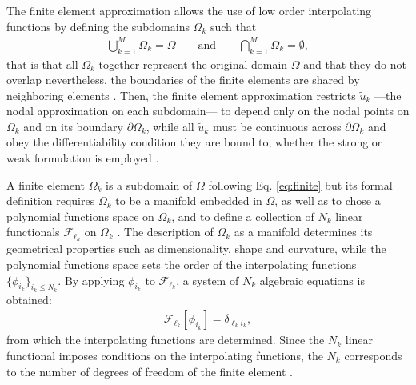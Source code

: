 
%
%
%
The finite element approximation allows the use of low order interpolating functions by defining the subdomains $\Omega_k$ such that
%
\begin{align}
    \bigcup_{k=1}^M \Omega_k = \Omega
        \qquad
        \text{and}
        \qquad
    \bigcap_{k=1}^M \Omega_k = \emptyset,
\label{eq:finite}
\end{align}
%
that is that all $\Omega_k$ together represent the original domain $\Omega$ and that they do not overlap nevertheless, the boundaries of the finite elements are shared by neighboring elements \cite{dhatt_finite_2012}. Then, the finite element approximation restricts  $\tilde{u}_k$  ---the nodal approximation  on each subdomain--- to depend only on the nodal points on $\Omega_k$ and on its boundary $\partial\Omega_k$, while all $\tilde{u}_k$ must be continuous across $\partial \Omega_k$ and obey the  differentiability condition they are bound to, whether the strong or weak formulation is employed \cite{dhatt_finite_2012}.

%
%
A finite element $\Omega_k$ is a subdomain of $\Omega$ following Eq. \eqref{eq:finite} but its formal definition requires $\Omega_k$ to be a manifold embedded in $\Omega$, as well as to chose a polynomial functions space on $\Omega_k$, and to define a collection of $N_k$ linear functionals $\mathcal{F}_{\ell_k}$ on $\Omega_k$ \cite{larson_finite_2013}. The description of $\Omega_k$ as a manifold determines its geometrical properties such as dimensionality, shape and curvature, while the polynomial functions space sets the order of the interpolating functions $\{\phi_{i_k}\}_{i_k\leq N_k}$. By applying $\phi_{i_k}$ to  $\mathcal{F}_{\ell_k}$, a system of $N_k$ algebraic  equations is obtained:
%
\begin{align}
    \mathcal{F}_{\ell_k}[\phi_{i_k}] = \delta_{{\ell_k} {i_k}},
    \label{eq:linfunc}
\end{align}
%
from which the interpolating functions are determined. Since the $N_k$ linear functional imposes conditions on the interpolating functions, the $N_k$ corresponds to the number of degrees of freedom of the finite element \cite{larson_finite_2013}.

